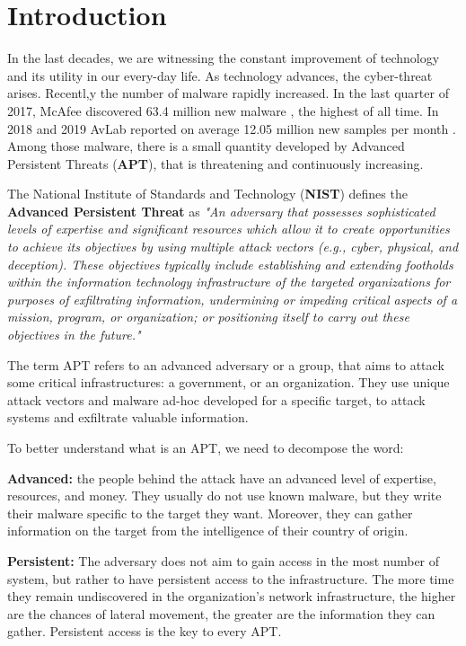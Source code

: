 \chapter{Introduction}

In the last decades, we are witnessing the constant improvement of technology and its utility in our every-day life. As technology advances, the cyber-threat arises.
Recentl,y the number of malware rapidly increased. In the last quarter of 2017, McAfee discovered 63.4 million new malware \cite{mcafee2018}, the highest of all time. In 2018 and 2019 AvLab reported on average 12.05 million new samples per month \cite{avtest2020}. Among those malware, there is a small quantity developed by Advanced Persistent Threats (\textbf{APT}), that is threatening and continuously increasing. 

The National Institute of Standards and Technology (\textbf{NIST}) defines the \textbf{Advanced Persistent Threat} as \cite{nistapt} \textit{"An adversary that possesses sophisticated levels of expertise and significant resources which allow it to create opportunities to achieve its objectives by using multiple attack vectors (e.g., cyber, physical, and deception). These objectives typically include establishing and extending footholds within the information technology infrastructure of the targeted organizations for purposes of exfiltrating information, undermining or impeding critical aspects of a mission, program, or organization; or positioning itself to carry out these objectives in the future."}

The term APT refers to an advanced adversary or a group, that aims to attack some critical infrastructures: a government, or an organization. They use unique attack vectors and malware ad-hoc developed for a specific target, to attack systems and exfiltrate valuable information.

To better understand what is an APT, we need to decompose the word: \cite{apt_def}

\textbf{Advanced:} the people behind the attack have an advanced level of expertise, resources, and money. They usually do not use known malware, but they write their malware specific to the target they want. Moreover, they can gather information on the target from the intelligence of their country of origin.

\textbf{Persistent:}  The adversary does not aim to gain access in the most number of system, but rather to have persistent access to the infrastructure. The more time they remain undiscovered in the organization's network infrastructure, the higher are the chances of lateral movement, the greater are the information they can gather. Persistent access is the key to every APT.

